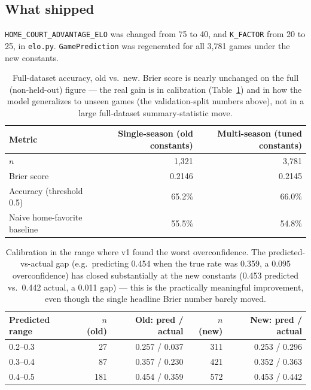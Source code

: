 \documentclass[11pt]{article}
\newcommand{\code}[1]{\allowbreak\texttt{\small #1}\allowbreak}
\begin{document}
\subsection{What shipped}

\code{HOME\_COURT\_ADVANTAGE\_ELO} was changed from 75 to 40, and \code{K\_FACTOR} from 20 to 25, in
\code{elo.py}. \code{GamePrediction} was regenerated for all 3,781 games under the new constants.

\begin{table}[h]
\centering
\begin{tabular}{lrr}
\toprule
Metric & Single-season (old constants) & Multi-season (tuned constants) \\
\midrule
$n$ & 1,321 & 3,781 \\
Brier score & 0.2146 & 0.2145 \\
Accuracy (threshold 0.5) & 65.2\% & 66.0\% \\
Naive home-favorite baseline & 55.5\% & 54.8\% \\
\bottomrule
\end{tabular}
\caption{Full-dataset accuracy, old vs.\ new. Brier score is nearly unchanged on the full (non-held-out)
figure — the real gain is in calibration (Table~\ref{tab:calibration}) and in how the model generalizes to
unseen games (the validation-split numbers above), not in a large full-dataset summary-statistic move.}
\end{table}

\begin{table}[h]
\centering
\small
\begin{tabular}{lrrrr}
\toprule
Predicted range & $n$ (old) & Old: pred / actual & $n$ (new) & New: pred / actual \\
\midrule
0.2--0.3 & 27 & 0.257 / 0.037 & 311 & 0.253 / 0.296 \\
0.3--0.4 & 87 & 0.357 / 0.230 & 421 & 0.352 / 0.363 \\
0.4--0.5 & 181 & 0.454 / 0.359 & 572 & 0.453 / 0.442 \\
\bottomrule
\end{tabular}
\caption{Calibration in the range where v1 found the worst overconfidence. The predicted-vs-actual gap
(e.g.\ predicting 0.454 when the true rate was 0.359, a 0.095 overconfidence) has closed substantially at the
new constants (0.453 predicted vs.\ 0.442 actual, a 0.011 gap) — this is the practically meaningful
improvement, even though the single headline Brier number barely moved.}
\label{tab:calibration}
\end{table}
\end{document}
